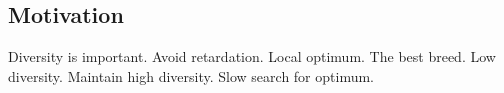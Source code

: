 
\subsection{Motivation}
\label{sec:motivation}

Diversity is important. Avoid retardation.
Local optimum. The best breed. Low diversity.
Maintain high diversity. Slow search for optimum.
\cite{ursem2002diversity}
